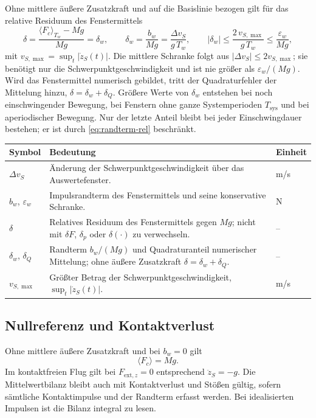 \documentclass[11pt,a4paper]{article}
\makeatletter
\newenvironment{symtab}{\begin{longtable}{@{}L{.22\textwidth}L{.62\textwidth}L{.12\textwidth}@{}}\toprule\textbf{Symbol}&\textbf{Bedeutung}&\textbf{Einheit}\\\midrule\endhead}{\bottomrule\end{longtable}}
\makeatother
\begin{document}
Ohne mittlere äußere Zusatzkraft und auf die Basislinie bezogen gilt für das relative Residuum des Fenstermittels
\begin{equation}
\delta=\frac{\langle F_c\rangle_{T_w}-Mg}{Mg}=\delta_w,\qquad
\delta_w=\frac{b_w}{Mg}=\frac{\Delta v_S}{g\,T_w},\qquad
|\delta_w|\le\frac{2\,v_{S,\max}}{g\,T_w}\le\frac{\varepsilon_w}{Mg},
\label{eq:randterm-rel}
\end{equation}
mit $v_{S,\max}=\sup_t|\dot z_S(t)|$. Die mittlere Schranke folgt aus $|\Delta v_S|\le2v_{S,\max}$; sie benötigt nur die Schwerpunktgeschwindigkeit und ist nie größer als $\varepsilon_w/(Mg)$. Wird das Fenstermittel numerisch gebildet, tritt der Quadraturfehler der Mittelung hinzu, $\delta=\delta_w+\delta_Q$. Größere Werte von $\delta_w$ entstehen bei noch einschwingender Bewegung, bei Fenstern ohne ganze Systemperioden $T_{\mathrm{sys}}$ und bei aperiodischer Bewegung. Nur der letzte Anteil bleibt bei jeder Einschwingdauer bestehen; er ist durch \eqref{eq:randterm-rel} beschränkt.
\begin{symtab}
$\Delta v_S$&Änderung der Schwerpunktgeschwindigkeit über das Auswertefenster.&m/s\\
$b_w$, $\varepsilon_w$&Impulsrandterm des Fenstermittels und seine konservative Schranke.&N\\
$\delta$&Relatives Residuum des Fenstermittels gegen $Mg$; nicht mit $\delta F$, $\delta_p$ oder $\delta(\cdot)$ zu verwechseln.&--\\
$\delta_w$, $\delta_Q$&Randterm $b_w/(Mg)$ und Quadraturanteil numerischer Mittelung; ohne äußere Zusatzkraft $\delta=\delta_w+\delta_Q$.&--\\
$v_{S,\max}$&Größter Betrag der Schwerpunktgeschwindigkeit, $\sup_t|\dot z_S(t)|$.&m/s\\
\end{symtab}

\subsection{Nullreferenz und Kontaktverlust}
Ohne mittlere äußere Zusatzkraft und bei $b_w=0$ gilt
\begin{equation}\langle F_c\rangle=Mg.\label{eq:basis}\end{equation}
Im kontaktfreien Flug gilt bei $F_{\mathrm{ext},z}=0$ entsprechend $\ddot z_S=-g$. Die Mittelwertbilanz bleibt auch mit Kontaktverlust und Stößen gültig, sofern sämtliche Kontaktimpulse und der Randterm erfasst werden. Bei idealisierten Impulsen ist die Bilanz integral zu lesen.
\end{document}
